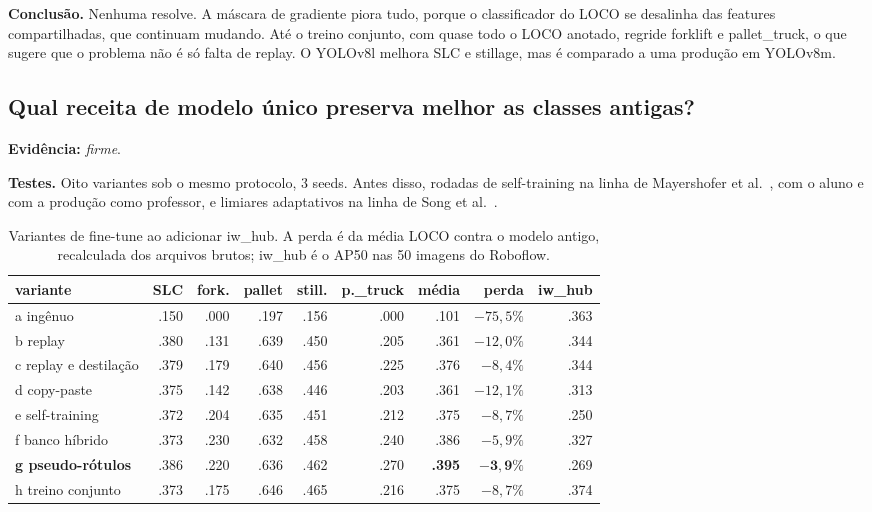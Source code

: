 \documentclass[11pt,a4paper]{article}
\newcommand{\evidencia}[1]{\noindent\textbf{Evidência:} \emph{#1}.\par}
\newcommand{\testes}{\noindent\textbf{Testes.} }
\newcommand{\conclusao}{\noindent\textbf{Conclusão.} }
\begin{document}
\conclusao Nenhuma resolve. A máscara de gradiente piora tudo, porque o
classificador do LOCO se desalinha das features compartilhadas, que continuam
mudando. Até o treino conjunto, com quase todo o LOCO anotado, regride forklift
e pallet\_truck, o que sugere que o problema não é só falta de replay. O YOLOv8l
melhora SLC e stillage, mas é comparado a uma produção em YOLOv8m.

\subsection{Qual receita de modelo único preserva melhor as classes antigas?}
\evidencia{firme}

\testes Oito variantes sob o mesmo protocolo, 3 seeds. Antes disso, rodadas de
self-training na linha de Mayershofer et al.~\cite{selftraining}, com o aluno e
com a produção como professor, e limiares adaptativos na linha de
Song et al.~\cite{apple}.

\begin{table}[H]
\centering\small
\caption{Variantes de fine-tune ao adicionar iw\_hub. A perda é da média LOCO
contra o modelo antigo, recalculada dos arquivos brutos; iw\_hub é o AP50 nas 50 imagens do Roboflow.}
\label{tab:baselines}
\setlength{\tabcolsep}{4pt}
\begin{tabular}{lrrrrrrrr}
\toprule
variante & SLC & fork. & pallet & still. & p.\_truck & média & perda & iw\_hub \\
\midrule
a ingênuo & .150 & .000 & .197 & .156 & .000 & .101 & $-75{,}5\%$ & .363 \\
b replay & .380 & .131 & .639 & .450 & .205 & .361 & $-12{,}0\%$ & .344 \\
c replay e destilação & .379 & .179 & .640 & .456 & .225 & .376 & $-8{,}4\%$ & .344 \\
d copy-paste & .375 & .142 & .638 & .446 & .203 & .361 & $-12{,}1\%$ & .313 \\
e self-training & .372 & .204 & .635 & .451 & .212 & .375 & $-8{,}7\%$ & .250 \\
f banco híbrido & .373 & .230 & .632 & .458 & .240 & .386 & $-5{,}9\%$ & .327 \\
\textbf{g pseudo-rótulos} & .386 & .220 & .636 & .462 & .270 & \textbf{.395} & $\mathbf{-3{,}9\%}$ & .269 \\
h treino conjunto & .373 & .175 & .646 & .465 & .216 & .375 & $-8{,}7\%$ & .374 \\
\bottomrule
\end{tabular}
\end{table}
\end{document}

